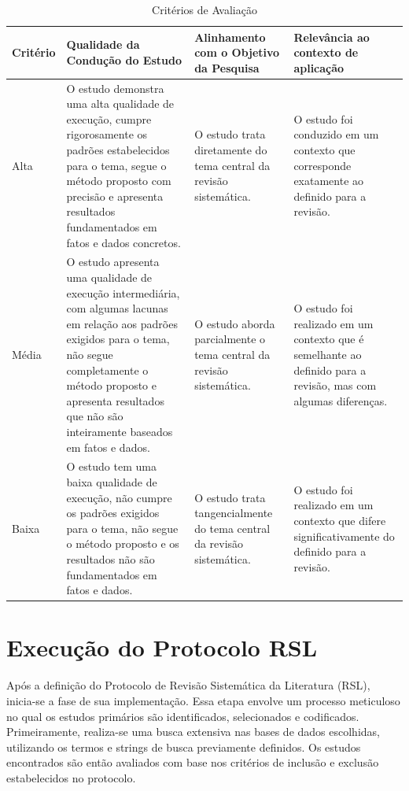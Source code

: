 \begin{table}[h]
\caption{Critérios de Avaliação}
\label{tab:criterios-avaliacao}
\begin{tabular}{p{2cm}p{4.5cm}p{4cm}p{4cm}}
\hline
\textbf{Critério} & \textbf{Qualidade da Condução do Estudo} & \textbf{Alinhamento com o Objetivo da Pesquisa} & \textbf{Relevância ao contexto de aplicação} \\
\hline
Alta & O estudo demonstra uma alta qualidade de execução, cumpre rigorosamente os padrões estabelecidos para o tema, segue o método proposto com precisão e apresenta resultados fundamentados em fatos e dados concretos. & O estudo trata diretamente do tema central da revisão sistemática. & O estudo foi conduzido em um contexto que corresponde exatamente ao definido para a revisão. \\
\hline
Média & O estudo apresenta uma qualidade de execução intermediária, com algumas lacunas em relação aos padrões exigidos para o tema, não segue completamente o método proposto e apresenta resultados que não são inteiramente baseados em fatos e dados. & O estudo aborda parcialmente o tema central da revisão sistemática. & O estudo foi realizado em um contexto que é semelhante ao definido para a revisão, mas com algumas diferenças. \\
\hline
Baixa & O estudo tem uma baixa qualidade de execução, não cumpre os padrões exigidos para o tema, não segue o método proposto e os resultados não são fundamentados em fatos e dados. & O estudo trata tangencialmente do tema central da revisão sistemática. & O estudo foi realizado em um contexto que difere significativamente do definido para a revisão. \\
\hline
\end{tabular}
\end{table}

\section{Execução do Protocolo RSL}
\label{sec:execucao-rsl}

Após a definição do Protocolo de Revisão Sistemática da Literatura (RSL), inicia-se a fase de
sua implementação. Essa etapa envolve um processo meticuloso no qual os estudos primários são
identificados, selecionados e codificados. Primeiramente, realiza-se uma busca extensiva nas bases
de dados escolhidas, utilizando os termos e strings de busca previamente definidos. Os estudos
encontrados são então avaliados com base nos critérios de inclusão e exclusão estabelecidos no
protocolo.

